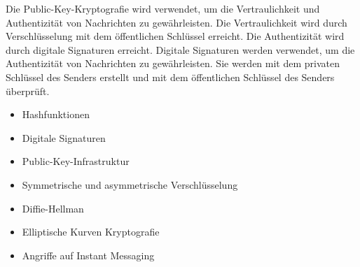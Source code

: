 \noindent Die Public-Key-Kryptografie wird verwendet, um die Vertraulichkeit und Authentizität von Nachrichten zu gewährleisten. Die Vertraulichkeit wird durch Verschlüsselung mit dem öffentlichen Schlüssel erreicht. Die Authentizität wird durch digitale Signaturen erreicht. Digitale Signaturen werden verwendet, um die Authentizität von Nachrichten zu gewährleisten. Sie werden mit dem privaten Schlüssel des Senders erstellt und mit dem öffentlichen Schlüssel des Senders überprüft. \\

\begin{itemize}
    \item Hashfunktionen
    \item Digitale Signaturen
    \item Public-Key-Infrastruktur
    \item Symmetrische und asymmetrische Verschlüsselung
    \item Diffie-Hellman
    \item Elliptische Kurven Kryptografie
    \item Angriffe auf Instant Messaging
\end{itemize}
